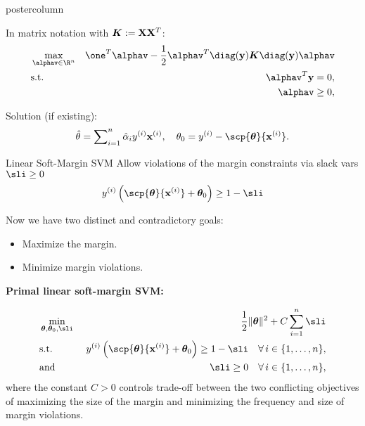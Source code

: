 \documentclass{beamer}
\begin{document}
\begin{frame}[fragile]{}
\begin{columns}
\begin{column}{.31\textwidth}
\begin{beamercolorbox}[center]{postercolumn}
\begin{minipage}{.98\textwidth}
{\begin{myblock}{}
In matrix notation with $\bm{K}:= \mathbf{X} \mathbf{X}^T$:
\begin{eqnarray*}
  & \max\limits_{\alphav \in \R^n} & \one^T \alphav - \frac{1}{2} \alphav^T \diag(\yv)\bm{K} \diag(\yv) \alphav \\
  & \text{s.t.} & \alphav^T \yv = 0, \\
  & \quad & \alphav \geq 0,
\end{eqnarray*}

Solution (if existing):
								$$
								\thetah = \sum\nolimits_{i=1}^n \hat \alpha_i \yi \xi, \quad \theta_0 = \yi - \scp{\thetav}{\xi}.
								$$
  \end{myblock}

  \begin{myblock}{Linear Soft-Margin SVM}
    Allow violations of the margin constraints via slack vars $\sli \geq 0$
    $$
    \yi \left( \scp{\thetav}{\xi} + \thetav_0 \right) \geq 1 - \sli
    $$

    Now we have two distinct and contradictory goals:
    \begin{itemize}[$\bullet$]
      \setlength{\itemindent}{+.3in}
      \item Maximize the margin.
      \item Minimize margin violations.
    \end{itemize}

    \begin{codebox}
      \textbf{Primal linear soft-margin SVM:} 
    \end{codebox}	
							\begin{eqnarray*}
								& \min\limits_{\thetav, \thetav_0,\sli} & \frac{1}{2} \|\thetav\|^2 + C   \sum_{i=1}^n \sli \\
								& \text{s.t.} & \,\, \yi  \left( \scp{\thetav}{\xi} + \thetav_0 \right) \geq 1 - \sli \quad \forall\, i \in \nset,\\
								& \text{and} & \,\, \sli \geq 0 \quad \forall\, i \in \nset,\\
							\end{eqnarray*}
							where the constant $C > 0$ controls trade-off between the two conflicting
							objectives of maximizing the size of the margin and minimizing the
							frequency and size of margin violations.\\

    \end{myblock}
}
\end{minipage}
\end{beamercolorbox}
\end{column}


\end{columns}
\end{frame}
\end{document}

